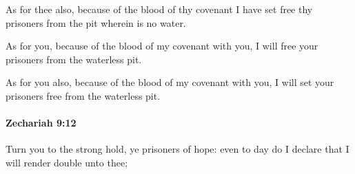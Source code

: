 			\begin{versebox}
					\item[BHS] 
					\item[LXX] 
					\item[ASV] As for thee also, because of the blood of thy covenant I have set free thy prisoners from the pit wherein is no water.
					\item[NIV] As for you, because of the blood of my covenant with you, I will free your prisoners from the waterless pit.
					\item[NRSV] As for you also, because of the blood of my covenant with you, I will set your prisoners free from the waterless pit.
			\end{versebox}

		\paragraph{Zechariah 9:12} %
			\label{ZECHARIAH-9-12}

			Turn you to the strong hold, ye prisoners of hope: even to day do I declare that I will render double unto thee;

